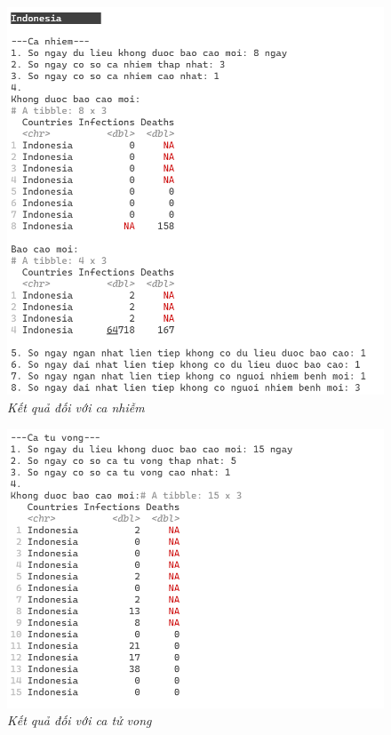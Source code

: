 \documentclass[a4paper]{article}
\theoremstyle{definition}
\begin{document}
\begin{figure}[H]
    \begin{center}
            \includegraphics[scale=0.6]{iii/idn_1.png}
    \end{center}
    \caption{\it Kết quả đối với ca nhiễm}
\end{figure}
\begin{figure}[H]
    \begin{center}
            \includegraphics[scale=0.6]{iii/idn_2.png}
    \end{center}
    \caption{\it Kết quả đối với ca tử vong}
\end{figure}
\end{document}
